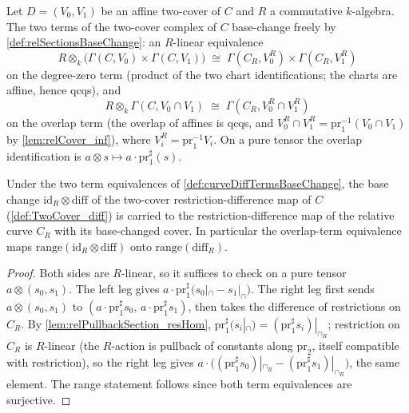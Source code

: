\begin{definition}
  \label{def:curveDiffTermsBaseChange}
  \leanok
  Let \(D = (V_0, V_1)\) be an affine two-cover of \(C\) and \(R\) a commutative
  \(k\)-algebra. The two terms of the two-cover complex of \(C\) base-change freely by
  \ref{def:relSectionsBaseChange}: an \(R\)-linear equivalence
  \[
    R \otimes_k \bigl(\Gamma(C, V_0) \times \Gamma(C, V_1)\bigr)
    \;\cong\;
    \Gamma(C_R, V_0^R) \times \Gamma(C_R, V_1^R)
  \]
  on the degree-zero term (product of the two chart identifications; the charts are
  affine, hence qcqs), and
  \[
    R \otimes_k \Gamma(C, V_0 \cap V_1) \;\cong\; \Gamma(C_R, V_0^R \cap V_1^R)
  \]
  on the overlap term (the overlap of affines is qcqs, and
  \(V_0^R \cap V_1^R = \mathrm{pr}_1^{-1}(V_0 \cap V_1)\) by \ref{lem:relCover_inf}),
  where \(V_i^R = \mathrm{pr}_1^{-1} V_i\). On a pure tensor the overlap identification
  is \(a \otimes s \mapsto a \cdot \mathrm{pr}_1^\sharp(s)\).
\end{definition}

\begin{theorem}
  \label{thm:curveDiffBaseChange}
  \leanok
  Under the two term equivalences of \ref{def:curveDiffTermsBaseChange}, the base
  change \(\mathrm{id}_R \otimes \mathrm{diff}\) of the two-cover
  restriction-difference map of \(C\) (\ref{def:TwoCover_diff}) is carried to the
  restriction-difference map of the relative curve \(C_R\) with its base-changed cover.
  In particular the overlap-term equivalence maps
  \(\mathrm{range}(\mathrm{id}_R \otimes \mathrm{diff})\) onto
  \(\mathrm{range}(\mathrm{diff}_R)\).
\end{theorem}
\begin{proof}
  \leanok
  Both sides are \(R\)-linear, so it suffices to check on a pure tensor
  \(a \otimes (s_0, s_1)\). The left leg gives
  \(a \cdot \mathrm{pr}_1^\sharp\bigl(s_0|_\cap - s_1|_\cap\bigr)\). The right leg
  first sends \(a \otimes (s_0, s_1)\) to
  \((a \cdot \mathrm{pr}_1^\sharp s_0,\, a \cdot \mathrm{pr}_1^\sharp s_1)\), then takes
  the difference of restrictions on \(C_R\). By
  \ref{lem:relPullbackSection_resHom}, \(\mathrm{pr}_1^\sharp(s_i|_\cap) =
  (\mathrm{pr}_1^\sharp s_i)|_{\cap_R}\); restriction on \(C_R\) is \(R\)-linear (the
  \(R\)-action is pullback of constants along \(\mathrm{pr}_2\), itself compatible with
  restriction), so the right leg gives
  \(a \cdot \bigl((\mathrm{pr}_1^\sharp s_0)|_{\cap_R} -
  (\mathrm{pr}_1^\sharp s_1)|_{\cap_R}\bigr)\), the same element. The range statement
  follows since both term equivalences are surjective.
\end{proof}

